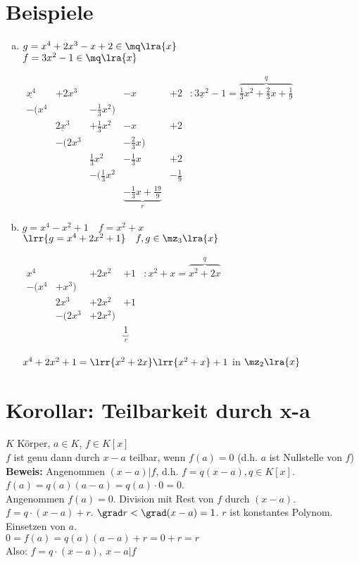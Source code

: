 \section{Beispiele}
	\begin{enumerate}[a)]
		\item $g=x^4+2x^3-x+2\in\mq\lra{x}$\\
			$f=3x^2-1\in\mq\lra{x}$

			$\begin{array}{rrrrrl}
				\underline{x^4}	&+2x^3				&						&-x				&+2			&: \underline{3x^2}-1=\overbrace{\frac{1}{3}x^2+\frac{2}{3}x+\frac{1}{9}}^{q}\\
				-(x^4			&					&-\frac{1}{3}x^2)		&				&&\\
								&\underline{2x^3}	&+\frac{1}{3}x^2			&-x			&+2&\\
								&-(2x^3				&						&-\frac{2}{3}x)	&&\\
								&					&\frac{1}{3}x^2			&-\frac{1}{3}x	&+2	&\\
								&					&-(\frac{1}{3}x^2		&				&-\frac{1}{9}	&\\
								&					&						&\underbrace{-\frac{1}{3}x+\frac{19}{9}}_r&
			\end{array}$	
		\item $g=x^4-x^2+1\quad f=x^2+x$\\
			$\lrr{g=x^4+2x^2+1}\quad f,g\in \mz_3\lra{x}$

			$\begin{array}{rrlrl}
				x^4		&		&+2x^2	&+1		&:x^2+x=\overbrace{x^2+2x}^{q}\\
				-(x^4	&+x^3)			&\\
						&2x^3	&+2x^2	&+1\\
						&-(2x^3	&+2x^2)	&\\
						&		&		&\underbrace{1}_{r}
			\end{array}$

			$x^4+2x^2+1 =\lrr{x^2+2x}\lrr{x^2+x}+1$ in $\mz_2\lra{x}$
	\end{enumerate}

	\section{Korollar: Teilbarkeit durch x-a}

	$K$ Körper, $a\in K$, $f\in K[x]$\\
	$f$ ist genu dann durch $x-a$ teilbar, wenn $f(a)=0$ (d.h. $a$ ist Nullstelle von $f$)\\
	\textbf{Beweis:} Angenommen $(x-a)|f$, d.h. $f=q(x-a),q\in K[x]$. $f(a)=q(a)(a-a)=q(a)\cdot 0=0$.\\
	Angenommen $f(a)=0$. Division mit Rest von $f$ durch $(x-a)$.\\
	$f=q\cdot(x-a)+r$. $\grad r<\grad(x-a)=1$. $r$ ist konstantes Polynom. Einsetzen von $a$.\\
	$0=f(a)=q(a)(a-a)+r=0+r=r$\\
	Also: $f=q\cdot(x-a),\ x-a|f$

